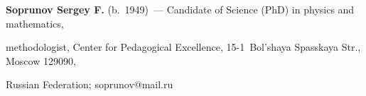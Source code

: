 \noindent


\textbf{Soprunov Sergey F.} (b.\ 1949)~--- Candidate of Science (PhD) in physics and mathematics, 


methodologist, Center for Pedagogical Excellence, 15-1~Bol'shaya Spasskaya Str., Moscow 129090, 


Russian Federation; \mbox{soprunov@mail.ru}





\label{end\stat}





\renewcommand{\bibname}{\protect\rm Литература} 


  


